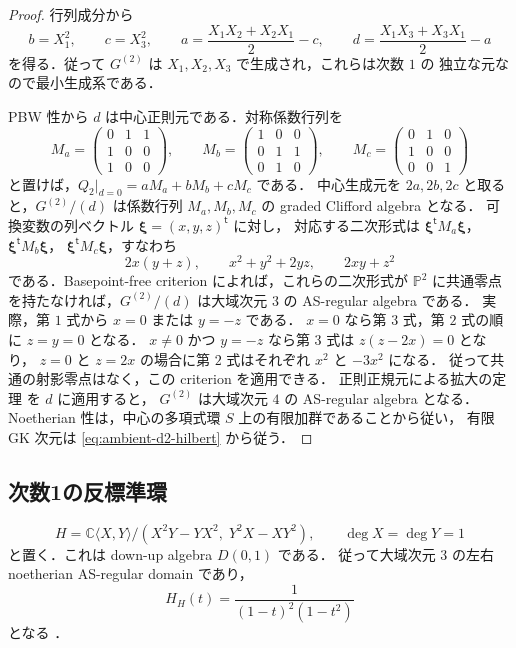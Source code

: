 \begin{proof}
行列成分から
\[
 b=X_1^2,\qquad c=X_3^2,\qquad
 a=\frac{X_1X_2+X_2X_1}{2}-c,\qquad
 d=\frac{X_1X_3+X_3X_1}{2}-a
\]
を得る．従って $G^{(2)}$ は $X_1,X_2,X_3$ で生成され，これらは次数 $1$ の
独立な元なので最小生成系である．

PBW 性から $d$ は中心正則元である．対称係数行列を
\[
 M_a=\begin{pmatrix}0&1&1\\1&0&0\\1&0&0\end{pmatrix},\qquad
 M_b=\begin{pmatrix}1&0&0\\0&1&1\\0&1&0\end{pmatrix},\qquad
 M_c=\begin{pmatrix}0&1&0\\1&0&0\\0&0&1\end{pmatrix}
\]
と置けば，$Q_2|_{d=0}=aM_a+bM_b+cM_c$ である．
中心生成元を $2a,2b,2c$ と取ると，$G^{(2)}/(d)$ は係数行列
$M_a,M_b,M_c$ の graded Clifford algebra となる．
可換変数の列ベクトル $\boldsymbol{\xi}=(x,y,z)^{\mathsf t}$ に対し，
対応する二次形式は $\boldsymbol{\xi}^{\mathsf t}M_a\boldsymbol{\xi}$，
$\boldsymbol{\xi}^{\mathsf t}M_b\boldsymbol{\xi}$，
$\boldsymbol{\xi}^{\mathsf t}M_c\boldsymbol{\xi}$，すなわち
\[
 2x(y+z),\qquad x^2+y^2+2yz,\qquad 2xy+z^2
\]
である．Basepoint-free criterion \cite[Theorem~1.1]{CV2010} によれば，これらの二次形式が
$\mathbb P^2$ に共通零点を持たなければ，$G^{(2)}/(d)$ は大域次元 $3$ の
AS-regular algebra である．
実際，第 $1$ 式から $x=0$ または $y=-z$ である．
$x=0$ なら第 $3$ 式，第 $2$ 式の順に $z=y=0$ となる．
$x\neq0$ かつ $y=-z$ なら第 $3$ 式は $z(z-2x)=0$ となり，
$z=0$ と $z=2x$ の場合に第 $2$ 式はそれぞれ $x^2$ と $-3x^2$ になる．
従って共通の射影零点はなく，この criterion を適用できる．
正則正規元による拡大の定理 \cite[Proposition~2.1]{CKS2019} を $d$ に適用すると，
$G^{(2)}$ は大域次元 $4$ の AS-regular algebra となる．
Noetherian 性は，中心の多項式環 $S$ 上の有限加群であることから従い，
有限 GK 次元は \eqref{eq:ambient-d2-hilbert} から従う．
\end{proof}

\subsection{次数1の反標準環}

\begin{equation}
 H=\mathbb C\langle X,Y\rangle/
 (X^2Y-YX^2,\;Y^2X-XY^2),\qquad \deg X=\deg Y=1
 \label{eq:down-up-base}
\end{equation}
と置く．これは down-up algebra $D(0,1)$ である．
従って大域次元 $3$ の左右 noetherian AS-regular domain であり，
\[
 H_H(t)=\frac1{(1-t)^2(1-t^2)}
\]
となる \cite[Lemma~1.1]{CKZ2017}．


